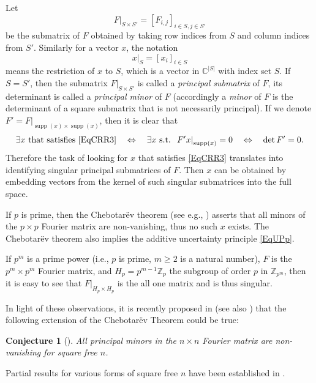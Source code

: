 \documentclass[A4,11pt]{article}
\DeclareMathOperator{\supp}{supp}
\newcommand{\eval}[2]{\left.#1\right|_{#2}}
\newtheorem{Conj}{Conjecture}
\begin{document}
Let
$$\eval{F}{S\times S'}=[F_{i,j}]_{i\in S, j\in S'}$$ 
be the submatrix of $F$ obtained by taking row indices from $S$ and column indices from $S'$. Similarly for a vector $x$, the notation 
$$\eval{x}{S}=[x_i]_{i\in S}$$
means the restriction of $x$ to $S$, which is a vector in $\mathbb C^{|S|}$ with index set $S$. If $S=S'$, then the submatrix $\eval{F}{S\times S'}$ is called a \emph{principal submatrix} of $F$, its determinant is called a \emph{principal minor} of $F$ (accordingly a \emph{minor} of $F$ is the determinant of a square submatrix that is not necessarily principal). If we denote $F'=\eval{F}{\supp(x)\times\supp(x)}$, then it is clear that
\begin{equation} \label{EqCRR4}
\exists x \text{ that satisfies \eqref{EqCRR3}} \quad \Leftrightarrow\quad \exists x \text{ s.t. } \eval{F'x}{\supp(x)}=0 \quad\Leftrightarrow\quad \det F'=0.
\end{equation}
Therefore the task of looking for $x$ that satisfies \eqref{EqCRR3} translates into identifying singular principal submatrices of $F$. Then $x$ can be obtained by embedding vectors from the kernel of such singular submatrices into the full space.

If $p$ is prime, then the Chebotar{\"e}v theorem (see e.g., \cite{stevenhagen1996}) asserts that all minors of the $p \times p$ Fourier matrix are non-vanishing, thus no such $x$ exists. The Chebotar{\"e}v theorem also implies the additive uncertainty principle \eqref{EqUPp}.

If $p^m$ is a prime power (i.e., $p$ is prime, $m\ge 2$ is a natural number), $F$ is the $p^m\times p^m$ Fourier matrix, and $H_p=p^{m-1}\mathbb Z_p$ the subgroup of order $p$ in $\mathbb Z_{p^m}$, then it is easy to see that $\eval{F}{H_p\times H_p}$ is the all one matrix and is thus singular.

In light of these observations, it is recently proposed in \cite{caragea2025} (see also \cite{cabrelli2025}) that the following extension of the Chebotar{\"e}v Theorem could be true:
\begin{Conj}[\cite{caragea2025}] \label{ConjCLMP}
All principal minors in the $n\times n$ Fourier matrix are non-vanishing for square free $n$.
\end{Conj}
Partial results for various forms of square free $n$ have been established in \cite{romanos2025,loukaki2025}.
\end{document}
